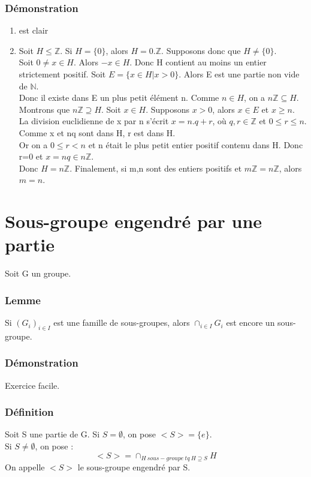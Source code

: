 \documentclass[a4paper, oneside]{report}
\newcommand{\N}{\mathbb{N}}
\newcommand{\Z}{\mathbb{Z}}
\begin{document}
\subsubsection{Démonstration}
\begin{enumerate}
\item est clair
\item Soit $H \leq \Z$. Si $H=\{0\}$, alors $H=0.\Z$. Supposons donc que $H\neq \{0\}$.\\
Soit $0\neq x\in H$. Alors $-x\in H$. Donc H contient au moins un entier strictement positif. Soit $E=\{x\in H | x>0 \}$. Alors E est une partie non vide de $\N$.\\
Donc il existe dans E un plus petit élément n. Comme $n\in H$, on a $n\Z \subseteq H$.\\
Montrons que $n\Z \supseteq H$. Soit $x\in H$. Supposons $x>0$, alors $x\in E$ et $x\geq n$.\\
La division euclidienne de x par n s'écrit $x=n.q+r$, où $q,r\in \Z$ et $0\leq r\leq n$.\\
Comme x et nq sont dans H, r est dans H.\\
Or on a $0\leq r<n$ et n était le plus petit entier positif contenu dans H. Donc r=0 et $x=nq \in n\Z$.\\
Donc $H=n\Z$. Finalement, si m,n sont des entiers positifs et $m\Z=n\Z$, alors $m=n$.
\end{enumerate}

\section{Sous-groupe engendré par une partie}
Soit G un groupe.

\subsubsection{Lemme}
Si $(G_i)_{i\in I}$ est une famille de sous-groupes, alors $\cap_{i\in I}G_i$ est encore un sous-groupe.

\subsubsection{Démonstration}
Exercice facile.\\

\subsubsection{Définition}
Soit S une partie de G. Si $S=\emptyset$, on pose $<S>=\{e\}$.\\
Si $S\neq \emptyset$, on pose :
$$<S> = \cap_{H~sous-groupe~tq~H\supseteq S}H$$
On appelle $<S>$ le sous-groupe engendré par S.\\
\end{document}
